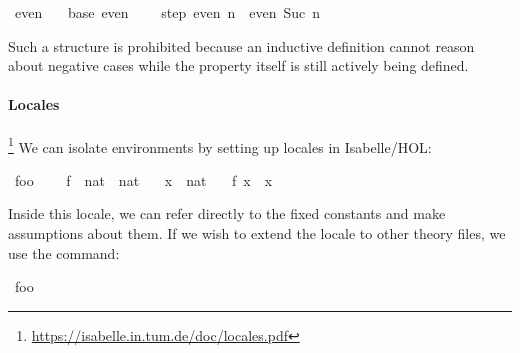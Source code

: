 \begin{isabellebody} \isanewline
{}\isamarkupfalse%
\ even\ \isanewline
\ \ base{\isacharcolon}{\kern0pt}\ {\isachardoublequoteopen}even\ {}{\isachardoublequoteclose}\ {\isacharbar}{\kern0pt}\isanewline
\ \ step{\isacharcolon}{\kern0pt}\ {\isachardoublequoteopen}{\isasymnot}even\ n\ {\isacharequal}{\kern0pt}{\isacharequal}{\kern0pt}{\isachargreater}{\kern0pt}\ even\ {\isacharparenleft}{\kern0pt}Suc\ n{\isacharparenright}{\kern0pt}{\isachardoublequoteclose}\isanewline
%
\ \ 
\end{isabellebody}

Such a structure is prohibited because an inductive definition cannot reason about negative cases
while the property itself is still actively being defined.

\paragraph{Locales}\footnote{\url{https://isabelle.in.tum.de/doc/locales.pdf}}
We can isolate environments by setting up locales in Isabelle/HOL:

\begin{isabellebody} \isanewline
{}\isamarkupfalse%
\ foo\ {\isacharequal}{\kern0pt}\isanewline
\ \ \ f\ {\isacharcolon}{\kern0pt}{\isacharcolon}{\kern0pt}\ {\isachardoublequoteopen}nat\ {\isacharequal}{\kern0pt}{\isachargreater}{\kern0pt}\ nat{\isachardoublequoteclose}\isanewline
\ \ \ x\ {\isacharcolon}{\kern0pt}{\isacharcolon}{\kern0pt}\ nat\isanewline
\ \ \ {\isachardoublequoteopen}f\ x\ {\isacharequal}{\kern0pt}\ x{\isachardoublequoteclose}\isanewline
%
\isanewline
%
\ \isanewline
{}\isamarkupfalse%
\end{isabellebody}


Inside this locale, we can refer directly to the fixed constants and make assumptions about them.
If we wish to extend the locale to other theory files, we use the  command:

\begin{isabellebody}\isanewline
{}\isamarkupfalse%
\ foo\isanewline
{}\isanewline
%
\ \isanewline
{}\isamarkupfalse%
\end{isabellebody}

